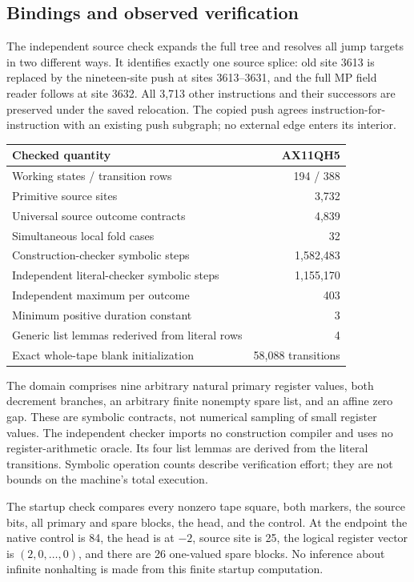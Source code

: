 \documentclass[11pt]{article}
\begin{document}
\subsection{Bindings and observed verification}

The independent source check expands the full tree and resolves all jump
targets in two different ways. It identifies exactly one source splice:
old site 3613 is replaced by the nineteen-site push at sites 3613--3631,
and the full MP field reader follows at site 3632. All 3,713 other
instructions and their successors are preserved under the saved relocation.
The copied push agrees instruction-for-instruction with an existing push
subgraph; no external edge enters its interior.

\begin{center}
\begin{tabular}{@{}lr@{}}\toprule
Checked quantity & AX11QH5\\\midrule
Working states / transition rows & 194 / 388\\
Primitive source sites & 3,732\\
Universal source outcome contracts & 4,839\\
Simultaneous local fold cases & 32\\
Construction-checker symbolic steps & 1,582,483\\
Independent literal-checker symbolic steps & 1,155,170\\
Independent maximum per outcome & 403\\
Minimum positive duration constant & 3\\
Generic list lemmas rederived from literal rows & 4\\
Exact whole-tape blank initialization & 58,088 transitions\\\bottomrule
\end{tabular}
\end{center}

The domain comprises nine arbitrary natural primary register values,
both decrement branches, an arbitrary finite nonempty spare list, and an
affine zero gap. These are symbolic contracts, not numerical sampling of
small register values. The independent checker imports no construction
compiler and uses no register-arithmetic oracle. Its four list lemmas are
derived from the literal transitions. Symbolic operation counts describe
verification effort; they are not bounds on the machine's total execution.

The startup check compares every nonzero tape square, both markers, the
source bits, all primary and spare blocks, the head, and the control. At
the endpoint the native control is 84, the head is at $-2$, source site is
25, the logical register vector is $(2,0,\ldots,0)$, and there are 26
one-valued spare blocks. No inference about infinite nonhalting is made
from this finite startup computation.
\end{document}
